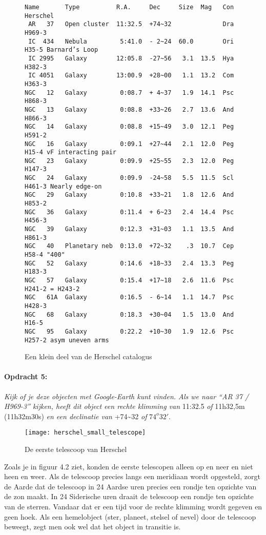 \begin{figure}[h]
\begin{verbatim}
Name       Type          R.A.     Dec     Size  Mag   Con  Herschel
 AR   37   Open cluster  11:32.5  +74~32              Dra  H969-3
 IC  434   Nebula         5:41.0  - 2~24  60.0        Ori  H35-5 Barnard’s Loop
 IC 2995   Galaxy        12:05.8  -27~56   3.1  13.5  Hya  H382-3
 IC 4051   Galaxy        13:00.9  +28~00   1.1  13.2  Com  H363-3
NGC   12   Galaxy         0:08.7  + 4~37   1.9  14.1  Psc  H868-3
NGC   13   Galaxy         0:08.8  +33~26   2.7  13.6  And  H866-3
NGC   14   Galaxy         0:08.8  +15~49   3.0  12.1  Peg  H591-2
NGC   16   Galaxy         0:09.1  +27~44   2.1  12.0  Peg  H15-4 vF interacting pair
NGC   23   Galaxy         0:09.9  +25~55   2.3  12.0  Peg  H147-3
NGC   24   Galaxy         0:09.9  -24~58   5.5  11.5  Scl  H461-3 Nearly edge-on
NGC   29   Galaxy         0:10.8  +33~21   1.8  12.6  And  H853-2
NGC   36   Galaxy         0:11.4  + 6~23   2.4  14.4  Psc  H456-3
NGC   39   Galaxy         0:12.3  +31~03   1.1  13.5  And  H861-3
NGC   40   Planetary neb  0:13.0  +72~32    .3  10.7  Cep  H58-4 "400"
NGC   52   Galaxy         0:14.6  +18~33   2.4  13.3  Peg  H183-3
NGC   57   Galaxy         0:15.4  +17~18   2.6  11.6  Psc  H241-2 = H243-2
NGC   61A  Galaxy         0:16.5  - 6~14   1.1  14.7  Psc  H428-3
NGC   68   Galaxy         0:18.3  +30~04   1.5  13.0  And  H16-5
NGC   95   Galaxy         0:22.2  +10~30   1.9  12.6  Psc  H257-2 asym uneven arms
\end{verbatim}
\caption{Een klein deel van de Herschel catalogus}
\end{figure}



\paragraph*{Opdracht 5:}

\emph{Kijk of je deze objecten met Google-Earth kunt vinden. Als we
naar ``AR 37 / H969-3'' kijken, heeft dit object een rechte klimming
van} 11:32.5 \emph{of} 11h32,5m (11h32m30s) \emph{en een declinatie
van} +74\textasciitilde{}32 \emph{of }$74^{o}32'$.

\begin{figure}[h]
\noindent \begin{centering}
\texttt{[image: herschel\_small\_telescope]}
\par\end{centering}

\caption{De eerste telescoop van Herschel}
\end{figure}
Zoals je in figuur 4.2 ziet, konden de eerste telescopen alleen op
en neer en niet heen en weer. Als de telescoop precies langs een meridiaan
wordt opgesteld, zorgt de Aarde dat de telescoop in 24 Aardse uren
precies een rondje ten opzichte van de zon maakt. In 24 Siderische
uren draait de telescoop een rondje ten opzichte van de sterren. Vandaar
dat er een tijd voor de rechte klimming wordt gegeven en geen hoek.
Als een hemelobject (ster, planeet, stelsel of nevel) door de telescoop
beweegt, zegt men ook wel dat het object in transitie is.


